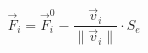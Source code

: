 \documentclass[12pt]{article}
\begin{document}
$$ 
  {\vec F}_i = {\vec F}^{0}_i - \frac{{\vec v}_i}{\|\vec{v}_i\|}\cdot S_e
$$
\end{document}
